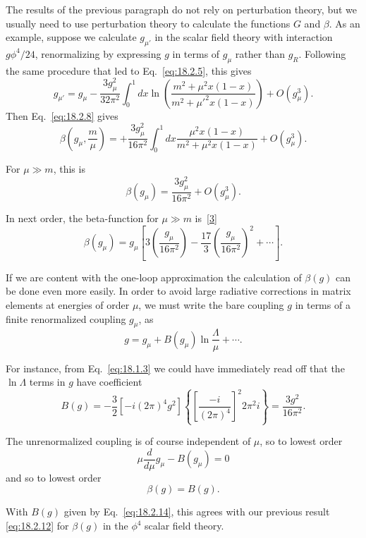 The results of the previous paragraph do not rely on perturbation theory, but
we usually need to use perturbation theory to calculate the functions $G$ and
$\beta$. As an example, suppose we calculate $g_{\mu'}$ in the scalar field
theory with interaction $g\phi^4/24$, renormalizing by expressing $g$ in terms
of $g_\mu$ rather than $g_R$. Following the same procedure that led to
Eq.~\eqref{eq:18.2.5}, this gives
\[
g_{\mu'}=g_\mu-\frac{3g_\mu^2}{32\pi^2}\int_0^1dx
\ln\left(\frac{m^2+\mu^2x(1-x)}{m^2+\mu'^2x(1-x)}\right)
+O(g_\mu^3).
\]
Then Eq.~\eqref{eq:18.2.8} gives
\begin{equation}
\beta\left(g_\mu,\frac{m}{\mu}\right)
=+\frac{3g_\mu^2}{16\pi^2}\int_0^1dx
\frac{\mu^2x(1-x)}{m^2+\mu^2x(1-x)}+O(g_\mu^3).
\tag{18.2.11}\label{eq:18.2.11}
\end{equation}
\par\noindent
For $\mu\gg m$, this is
\begin{equation}
\beta(g_\mu)=\frac{3g_\mu^2}{16\pi^2}+O(g_\mu^3).
\tag{18.2.12}\label{eq:18.2.12}
\end{equation}
\par\noindent
In next order, the beta-function for $\mu\gg m$ is~\hyperref[ch18-ref-3]{[3]}
\[
\beta(g_\mu)=g_\mu\left[3\left(\frac{g_\mu}{16\pi^2}\right)
-\frac{17}{3}\left(\frac{g_\mu}{16\pi^2}\right)^2+\cdots\right].
\]

If we are content with the one-loop approximation the calculation of
$\beta(g)$ can be done even more easily. In order to avoid large radiative
corrections in matrix elements at energies of order $\mu$, we must write the
bare coupling $g$ in terms of a finite renormalized coupling $g_\mu$, as
\begin{equation}
g=g_\mu+B(g_\mu)\ln\frac{\Lambda}{\mu}+\cdots.
\tag{18.2.13}\label{eq:18.2.13}
\end{equation}
\par\noindent
For instance, from Eq.~\eqref{eq:18.1.3} we could have immediately read off
that the $\ln\Lambda$ terms in $g$ have coefficient
\begin{equation}
B(g)=-\frac{3}{2}\left[-i(2\pi)^4g^2\right]
\left\{\left[\frac{-i}{(2\pi)^4}\right]^2 2\pi^2i\right\}
=\frac{3g^2}{16\pi^2}.
\tag{18.2.14}\label{eq:18.2.14}
\end{equation}
\par\noindent
The unrenormalized coupling is of course independent of $\mu$, so to lowest
order
\[
\mu\frac{d}{d\mu}g_\mu-B(g_\mu)=0
\]
and so to lowest order
\begin{equation}
\beta(g)=B(g).
\tag{18.2.15}\label{eq:18.2.15}
\end{equation}
\par\noindent
With $B(g)$ given by Eq.~\eqref{eq:18.2.14}, this agrees with our previous
result \eqref{eq:18.2.12} for $\beta(g)$ in the $\phi^4$ scalar field theory.


